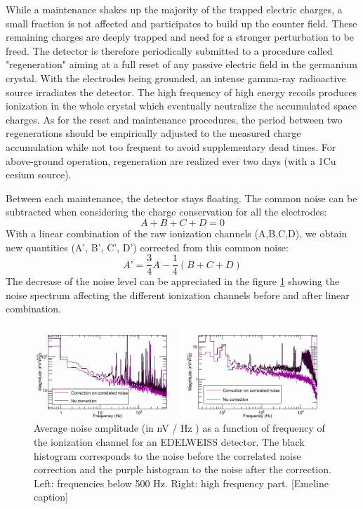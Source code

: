 While a maintenance shakes up the majority of the trapped electric charges, a small fraction is not affected and participates to build up the counter field. These remaining charges are deeply trapped and need for a stronger perturbation to be freed. The detector is therefore periodically submitted to a procedure called "regeneration" aiming at a full reset of any passive electric field in the germanium crystal. With the electrodes being grounded, an intense gamma-ray radioactive source irradiates the detector. The high frequency of high energy recoils produces ionization in the whole crystal which eventually neutralize the accumulated space charges. 
As for the reset and maintenance procedures, the period between two regenerations should be empirically adjusted to the measured charge accumulation while not too frequent to avoid supplementary dead times. For above-ground operation, regeneration are realized ever two days (with a 1Cu cesium source).

Between each maintenance, the detector stays floating. The common noise can be subtracted when considering the charge conservation for all the electrodes:
\begin{equation}
\label{eq:charge-conservation}
A + B + C + D = 0
\end{equation}
With a linear combination of the raw ionization channels (A,B,C,D), we obtain new quantities (A’, B’, C’, D’) corrected from this common noise:
\begin{equation}
\label{eq:common-noise-subtraction}
A’ = \frac{3}{4} A - \frac{1}{4} \left( B + C + D \right)
\end{equation} 
The decrease of the noise level can be appreciated in the figure \ref{fig:ionization-noise} showing the noise spectrum affecting the different ionization channels before and after linear combination.

\begin{figure}
\centering
\includegraphics[width=\textwidth]{Figures/Electrodes/ionization_noise.pdf}
\caption{Average noise amplitude (in nV / Hz ) as a function of frequency of the
ionization channel for an EDELWEISS detector. The black histogram corresponds to the
noise before the correlated noise correction and the purple histogram to the noise after
the correction. Left: frequencies below 500 Hz. Right: high frequency part. [Emeline caption]}
\label{fig:ionization-noise}
\end{figure}

